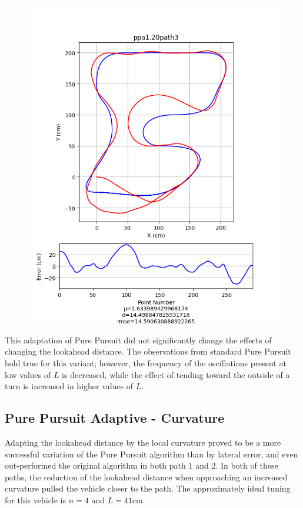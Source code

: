 \documentclass[mla7]{mla}
\begin{document}
\begin{paper}
\begin{figure}[H]
\endminipage\\
\includegraphics[width=\linewidth]{pathData/ppa1path3}
\endminipage
\end{figure}

This adaptation of Pure Pursuit did not significantly change the effects of changing the lookahead distance. The observations from standard Pure Pursuit hold true for this variant; however, the frequency of the oscillations present at low values of $L$ is decreased, while the effect of tending toward the outside of a turn is increased in higher values of $L$.

\subsection{Pure Pursuit Adaptive - Curvature}

Adapting the lookahead distance by the local curvature proved to be a more successful variation of the Pure Pursuit algorithm than by lateral error, and even out-performed the original algorithm in both path 1 and 2. In both of these paths, the reduction of the lookahead distance when approaching an increased curvature pulled the vehicle closer to the path. The approximately ideal tuning for this vehicle is $n=4$ and $L=41$cm.


\end{paper}
\end{document}
